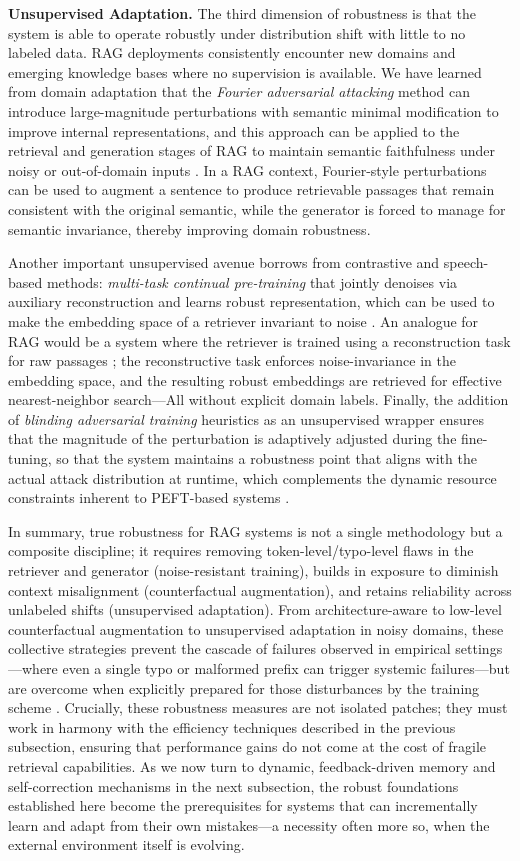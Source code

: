 \documentclass[11pt]{article}
\begin{document}
\textbf{Unsupervised Adaptation.} The third dimension of robustness is that the system is able to operate robustly under distribution shift with little to no labeled data. RAG deployments consistently encounter new domains and emerging knowledge bases where no supervision is available. We have learned from domain adaptation that the \emph{Fourier adversarial attacking} method can introduce large-magnitude perturbations with semantic minimal modification to improve internal representations, and this approach can be applied to the retrieval and generation stages of RAG to maintain semantic faithfulness under noisy or out-of-domain inputs \cite{ref106}. In a RAG context, Fourier-style perturbations can be used to augment a sentence to produce retrievable passages that remain consistent with the original semantic, while the generator is forced to manage for semantic invariance, thereby improving domain robustness.

Another important unsupervised avenue borrows from contrastive and speech-based methods: \emph{multi-task continual pre-training} that jointly denoises via auxiliary reconstruction and learns robust representation, which can be used to make the embedding space of a retriever invariant to noise \cite{ref107}. An analogue for RAG would be a system where the retriever is trained using a reconstruction task for raw passages ; the reconstructive task enforces noise-invariance in the embedding space, and the resulting robust embeddings are retrieved for effective nearest-neighbor search---All without explicit domain labels. Finally, the addition of \emph{blinding adversarial training} heuristics as an unsupervised wrapper ensures that the magnitude of the perturbation is adaptively adjusted during the fine-tuning, so that the system maintains a robustness point that aligns with the actual attack distribution at runtime, which complements the dynamic resource constraints inherent to PEFT-based systems \cite{ref102}.

In summary, true robustness for RAG systems is not a single methodology but a composite discipline; it requires removing token-level/typo-level flaws in the retriever and generator (noise-resistant training), builds in exposure to diminish context misalignment (counterfactual augmentation), and retains reliability across unlabeled shifts (unsupervised adaptation). From architecture-aware to low-level counterfactual augmentation to unsupervised adaptation in noisy domains, these collective strategies prevent the cascade of failures observed in empirical settings---where even a single typo or malformed prefix can trigger systemic failures---but are overcome when explicitly prepared for those disturbances by the training scheme \cite{ref97}. Crucially, these robustness measures are not isolated patches; they must work in harmony with the efficiency techniques described in the previous subsection, ensuring that performance gains do not come at the cost of fragile retrieval capabilities. As we now turn to dynamic, feedback-driven memory and self-correction mechanisms in the next subsection, the robust foundations established here become the prerequisites for systems that can incrementally learn and adapt from their own mistakes---a necessity often more so, when the external environment itself is evolving.
\end{document}
